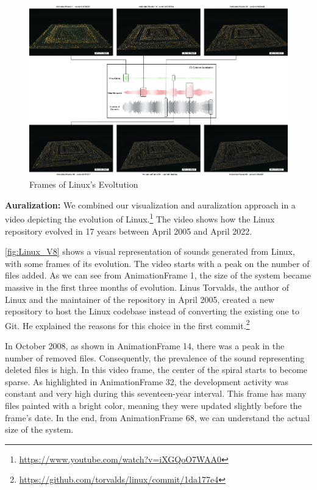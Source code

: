 \begin{landscape}
    \Huge 
    \begin{figure}[ht]
    \includegraphics[width=\linewidth]{LinuxAuralization.jpg}
    \caption{Frames of Linux's Evoltution} 
    \label{fig:Linux_V8}
\end{figure}
\end{landscape}

\newpage
\noindent
\textbf{Auralization:}
We combined our visualization and auralization approach in a video depicting the evolution of Linux.\footnote{\url{https://www.youtube.com/watch?v=iXGQoO7WAA0}} The video shows how the Linux repository evolved in 17 years between April 2005 and April 2022. 

\autoref{fig:Linux_V8} shows a visual representation of sounds generated from Linux, with some frames of its evolution. The video starts with a peak on the number of files added. As we can see from AnimationFrame 1, the size of the system became massive in the first three months of evolution. Linus Torvalds, the author of Linux and the maintainer of the repository in April 2005, created a new repository to host the Linux codebase instead of converting the existing one to Git. He explained the reasons for this choice in the first commit.\footnote{\url{https://github.com/torvalds/linux/commit/1da177e4}}

In October 2008, as shown in AnimationFrame 14, there was a peak in the number of removed files. Consequently, the prevalence of the sound representing deleted files is high. In this video frame, the center of the spiral starts to become sparse. As highlighted in AnimationFrame 32, the development activity was constant and very high during this 
seventeen-year interval. This frame has many files painted with a bright color, meaning they were updated slightly before the frame's date. 
In the end, from AnimationFrame 68, we can understand the actual size of the system.


